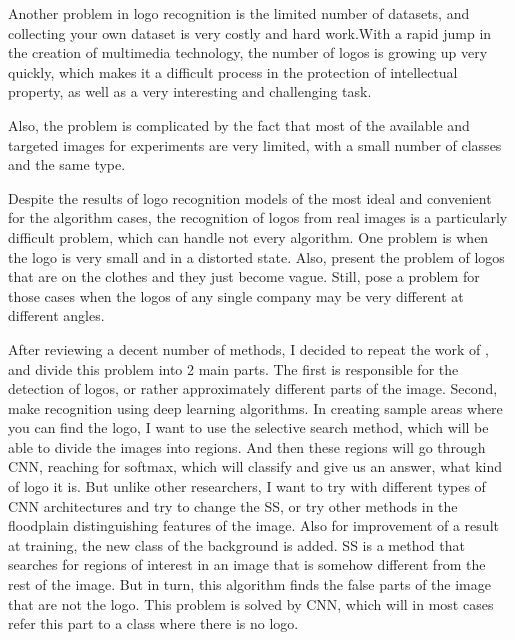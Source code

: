 \par Another problem in logo recognition is the limited number of datasets, and collecting your own dataset is very costly and hard work.With a rapid jump in the creation of multimedia technology, the number of logos is growing up very quickly, which makes it a difficult process in the protection of intellectual property, as well as a very interesting and challenging task.\cite{Symbolic}

\par Also, the problem is complicated by the fact that most of the available and targeted images for experiments are very limited, with a small number of classes and the same type.\cite{Scalable}

\par Despite the results of logo recognition models of the most ideal and convenient for the algorithm cases, the recognition of logos from real images is a particularly difficult problem, which can handle not every algorithm. One problem is when the logo is very small and in a distorted state. Also, present the problem of logos that are on the clothes and they just become vague. Still, pose a problem for those cases when the logos of any single company may be very different at different angles.\cite{LOGONET}

\par After reviewing a decent number of methods, I decided to repeat the work of \cite{DeepLearningForLogo}, and divide this problem into 2 main parts. The first is responsible for the detection of logos, or rather approximately different parts of the image. Second, make recognition using deep learning algorithms. In creating sample areas where you can find the logo, I want to use the selective search method, which will be able to divide the images into regions. And then these regions will go through CNN, reaching for softmax, which will classify and give us an answer, what kind of logo it is. But unlike other researchers, I want to try with different types of CNN architectures and try to change the SS, or try other methods in the floodplain distinguishing features of the image. Also for improvement of a result at training, the new class of the background is added. SS is a method that searches for regions of interest in an image that is somehow different from the rest of the image. But in turn, this algorithm finds the false parts of the image that are not the logo. This problem is solved by CNN, which will in most cases refer this part to a class where there is no logo.


